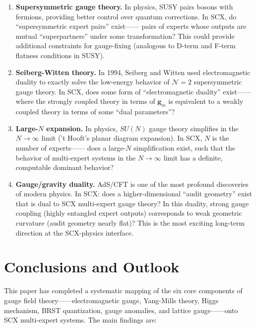 \documentclass[12pt,a4paper]{article}
\theoremstyle{remark}
\newcommand{\gaugeparam}{\mathbf{g}}
\begin{document}
\begin{enumerate}[label=\textbf{(D\arabic*)}]
    \item \textbf{Supersymmetric gauge theory.} In physics, SUSY pairs bosons with fermions,
    providing better control over quantum corrections. In SCX, do ``supersymmetric expert pairs'' exist——
    pairs of experts whose outputs are mutual ``superpartners'' under some transformation? This could provide
    additional constraints for gauge-fixing (analogous to D-term and F-term flatness conditions in SUSY).

    \item \textbf{Seiberg-Witten theory.} In 1994, Seiberg and Witten used electromagnetic duality
    to exactly solve the low-energy behavior of $\mathcal{N}=2$ supersymmetric gauge theory.
    In SCX, does some form of ``electromagnetic duality'' exist——where the strongly coupled theory
    in terms of $\gaugeparam_m$ is equivalent to a weakly coupled theory in terms of some ``dual parameters''?

    \item \textbf{Large-$N$ expansion.} In physics, $SU(N)$ gauge theory simplifies in the $N \to \infty$ limit
    ('t Hooft's planar diagram expansion). In SCX, $N$ is the number of experts——
    does a large-$N$ simplification exist, such that the behavior of multi-expert systems in the $N \to \infty$ limit
    has a definite, computable dominant behavior?

    \item \textbf{Gauge/gravity duality.} AdS/CFT is one of the most profound discoveries of modern physics.
    In SCX: does a higher-dimensional ``audit geometry'' exist that is dual to SCX multi-expert gauge theory?
    In this duality, strong gauge coupling (highly entangled expert outputs) corresponds to weak geometric curvature
    (audit geometry nearly flat)? This is the most exciting long-term direction at the SCX-physics interface.
\end{enumerate}

\newpage

\section{Conclusions and Outlook}

This paper has completed a systematic mapping of the six core components
of gauge field theory——electromagnetic gauge, Yang-Mills theory, Higgs mechanism,
BRST quantization, gauge anomalies, and lattice gauge——onto SCX multi-expert
systems. The main findings are:
\end{document}
